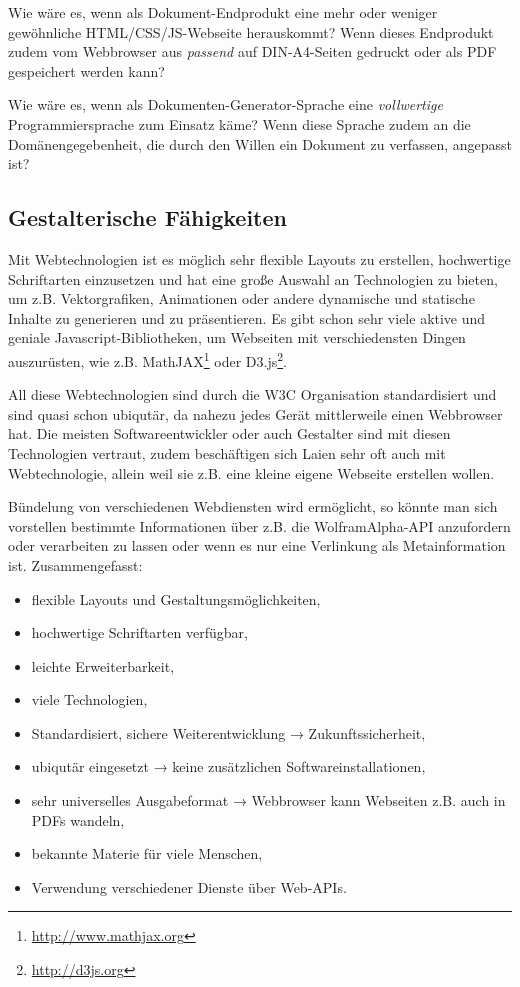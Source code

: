 Wie wäre es, wenn als Dokument-Endprodukt eine mehr oder weniger
gewöhnliche HTML/CSS/JS-Webseite herauskommt?
Wenn dieses Endprodukt zudem vom Webbrowser aus \emph{passend} auf
DIN-A4-Seiten gedruckt oder als PDF gespeichert werden kann?

Wie wäre es, wenn als Dokumenten-\-Generator-\-Sprache eine \emph{vollwertige}
Programmiersprache zum Einsatz käme? Wenn diese Sprache zudem an die
Domänen\-gege\-ben\-heit, die durch den Willen ein Dokument zu verfassen,
angepasst ist?

\subsection{Gestalterische Fähigkeiten}

Mit Webtechnologien ist es möglich sehr flexible Layouts zu erstellen,
hochwertige Schriftarten einzusetzen und hat eine große Auswahl an
Technologien zu bieten, um z.B. Vektorgrafiken, Animationen oder
andere dynamische und statische Inhalte zu generieren und zu
präsentieren. Es gibt schon sehr viele aktive und geniale Javascript-Bibliotheken,
um Webseiten mit verschiedensten Dingen auszurüsten,
wie z.B. MathJAX\footnote{\url{http://www.mathjax.org}} oder
D3.js\footnote{\url{http://d3js.org}}.

All diese Webtechnologien sind durch die W3C Organisation standardisiert
und sind quasi schon ubiqutär, da nahezu jedes Gerät mittlerweile einen
Webbrowser hat. Die meisten Softwareentwickler oder auch
Gestalter sind mit diesen Technologien vertraut, zudem beschäftigen sich
Laien sehr oft auch mit Webtechnologie, allein weil sie z.B. eine kleine
eigene Webseite erstellen wollen.

Bündelung von verschiedenen Webdiensten wird ermöglicht, so könnte man sich
vorstellen bestimmte Informationen über z.B. die WolframAlpha-API
anzufordern oder verarbeiten zu lassen oder wenn es nur eine Verlinkung
als Metainformation ist. Zusammengefasst:

\begin{itemize}
  \item flexible Layouts und Gestaltungsmöglichkeiten,
  \item hochwertige Schriftarten verfügbar,
  \item leichte Erweiterbarkeit,
  \item viele Technologien,
  \item Standardisiert, sichere Weiterentwicklung → Zukunftssicherheit,
  \item ubiqutär eingesetzt → keine zusätzlichen Softwareinstallationen,
  \item sehr universelles Ausgabeformat → Webbrowser
        kann Webseiten z.B. auch in PDFs wandeln,
  \item bekannte Materie für viele Menschen,
  \item Verwendung verschiedener Dienste über Web-APIs.
\end{itemize}

